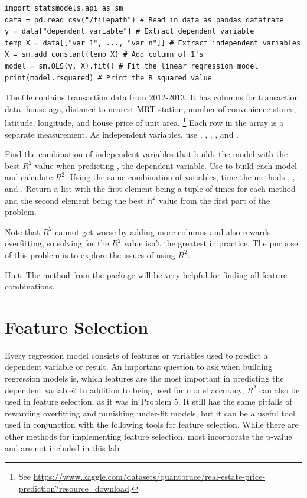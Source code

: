 \begin{lstlisting}
import statsmodels.api as sm
data = pd.read_csv("/filepath") # Read in data as pandas dataframe
y = data["dependent_variable"] # Extract dependent variable
temp_X = data[["var_1", ..., "var_n"]] # Extract independent variables
X = sm.add_constant(temp_X) # Add column of 1's
model = sm.OLS(y, X).fit() # Fit the linear regression model
print(model.rsquared) # Print the R squared value
\end{lstlisting}

\begin{problem}
The file  contains transaction data from 2012-2013. 
It has columns for transaction data, house age, distance to nearest MRT station, number of convenience stores, latitude, longitude, and house price of unit area. \footnote{See \url{https://www.kaggle.com/datasets/quantbruce/real-estate-price-prediction?resource=download}.}
Each row in the array is a separate measurement.
As independent variables, use , , , , and .

Find the combination of independent variables that builds the model with the best $R^2$ value when predicting , the dependent variable. Use  to build each model and calculate $R^2$.
Using the same combination of variables, time the methods , , and . 
Return a list with the first element being a tuple of times for each method and the second element being the best $R^2$ value from the first part of the problem.

Note that $R^2$ cannot get worse by adding more columns and also rewards overfitting, so solving for the $R^2$ value isn't the greatest in practice. The purpose of this problem is to explore the issues of using $R^2$. 

Hint: The  method from the  package will be very helpful for finding all feature combinations. 
\end{problem}

\section*{Feature Selection}

Every regression model consists of features or variables used to predict a dependent variable or result. 
An important question to ask when building regression models is, which features are the most important in predicting the dependent variable?
In addition to being used for model accuracy, $R^2$ can also be used in feature selection, as it was in Problem 5. 
It still has the same pitfalls of rewarding overfitting and punishing under-fit models, but it can be a useful tool used in conjunction with the following tools for feature selection.
While there are other methods for implementing feature selection, most incorporate the p-value and are not included in this lab. 

